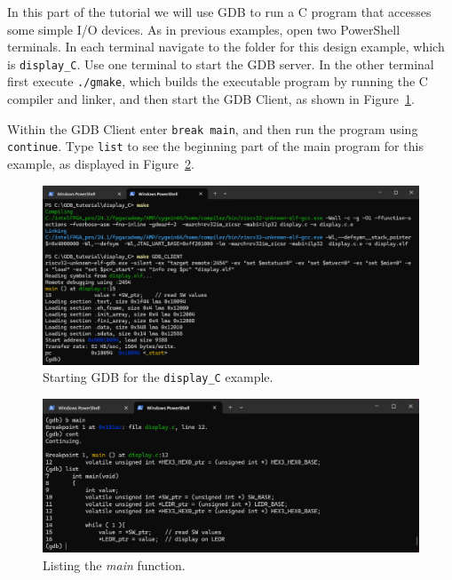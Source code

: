 \documentclass[11pt, twoside, pdftex]{article}
\begin{document}
In this part of the tutorial we will use GDB to run a C program that accesses some simple 
I/O devices. As in previous examples, open two PowerShell terminals. In each terminal 
navigate to the folder for this design example, which is \texttt{display\_C}. Use one 
terminal to start the GDB server. In the other terminal first execute \texttt{./gmake}, which 
builds the executable program by running the C compiler and linker, and then start the GDB 
Client, as shown in Figure~\ref{fig:display_C0}.

Within the GDB Client enter \texttt{break main}, and then run the program using \texttt{continue}.
Type \texttt{list} to see the beginning part of the main program for this example, as displayed in 
Figure~\ref{fig:display_C1}.

\begin{figure}[h]
    \begin{center}
        \includegraphics[scale=.6]{figures/display_C0.png}
        \caption{Starting GDB for the \texttt{display\_C} example.}
        \label{fig:display_C0}
    \end{center}
\end{figure}

\begin{figure}[h]
    \begin{center}
        \includegraphics[scale=.6]{figures/display_C1.png}
        \caption{Listing the {\it main} function.}
        \label{fig:display_C1}
    \end{center}
\end{figure}
\end{document}
